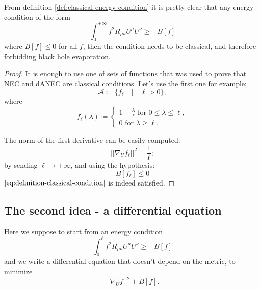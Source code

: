 	\begin{corollary}
		From definition \ref{def:classical-energy-condition} it is pretty clear that any energy condition of the form
		\[
			\int_0^{+\infty} f^2 R_{\mu\nu}U^{\mu}U^{\nu} \ge -B[f]	
		\]
		where \(B[f] \le 0\) for all \(f\), then the condition needs to be classical, and therefore forbidding black hole evaporation.
	\end{corollary}
	\begin{proof}
		It is enough to use one of sets of functions that was used to prove that NEC and dANEC are classical conditions. Let's use the first one for example:
		\[
		\mathcal{A} \coloneqq \{f_{\ell} \quad\vert\quad \ell >0\},
		\]
		where
		\[
			f_{\ell}(\lambda) \coloneqq
			\begin{cases}
				 1 - \frac{\lambda}{\ell} \text{ for } 0 \le \lambda \le \ell, \\	
				0 \text{ for } \lambda \ge \ell.
			\end{cases}
		\]

		The norm of the first derivative can be easily computed:
		\[
			\vert \vert \nabla_U f_{\ell} \vert\vert^2 	= \frac{1}{\ell};
		\]
		by sending \(\ell \rightarrow +\infty\), and using the hypothesis:
		\[
			B[f_{\ell}] \le 0	
		\]
		\(\eqref{eq:definition-classical-condition}\) is indeed satisfied.
	\end{proof}
	
	\subsection{The second idea - a differential equation}
	Here we suppose to start from an energy condition
	\[
		\int_0^{\ell} f^2 R_{\mu\nu}U^{\mu}U^{\nu} \ge -B[f]
	\]
	and we write a differential equation that doesn't depend on the metric, to minimize 
	\[
	\vert\vert \nabla_U f\vert\vert^2 + B[f].	
	\]
	
	

